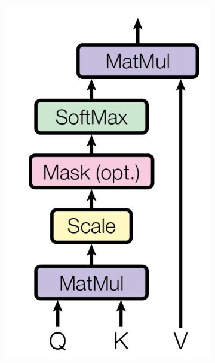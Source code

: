 \documentclass[12pt]{report}
\begin{document}
\begin{figure}[htbp]
    \centering
    \newlength{\MyOtherHeightFour}
    \begin{subfigure}[t]{0.49\textwidth}
        \centering
        \includegraphics[width=.6\textwidth]{images/related_works/transformer/scaled_dot_product_attention.jpg}

\end{subfigure}
\end{figure}
\end{document}
